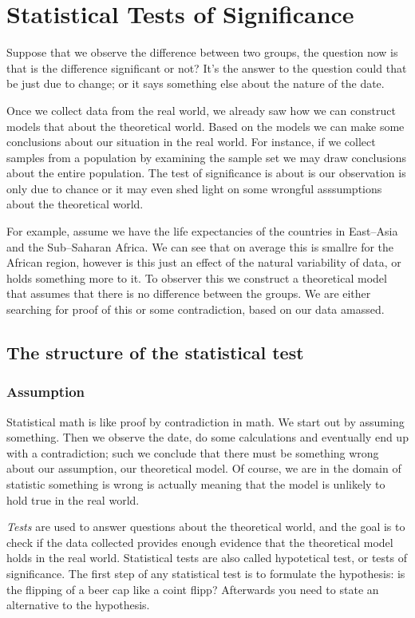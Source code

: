 \section{Statistical Tests of Significance}

Suppose that we observe the difference between two groups, the question now is
that is the difference significant or not? It's the answer to the question could
that be just due to change; or it says something else about the nature of the
date. 

Once we collect data from the real world, we already saw how we can construct
models that about the theoretical world. Based on the models we can make some
conclusions about our situation in the real world. For instance, if we collect
samples from a population by examining the sample set we may draw conclusions
about the entire population. The test of significance is about is our
observation is only due to chance or it may even shed light on some wrongful
asssumptions about the theoretical world. 

For example, assume we have the life expectancies of the countries in East--Asia
and the Sub--Saharan Africa. We can see that on average this is smallre for the
African region, however is this just an effect of the natural variability of
data, or holds something more to it. To observer this we construct a theoretical
model that assumes that there is no difference between the groups. We are either
searching for proof of this or some contradiction, based on our data amassed.

\subsection{The structure of the statistical test}

\subsubsection{Assumption}

Statistical math is like proof by contradiction in math. We start out by
assuming something. Then we observe the date, do some calculations and
eventually end up with a contradiction; such we conclude that there must be
something wrong about our assumption, our theoretical model. Of course, we are
in the domain of statistic something is wrong is actually meaning that the model
is unlikely to hold true in the real world.

\emph{Tests} are used to answer questions about the theoretical world, and the
goal is to check if the data collected provides enough evidence that the
theoretical model holds in the real world. Statistical tests are also called
hypotetical test, or tests of significance. The first step of any statistical
test is to formulate the hypothesis: is the flipping of a beer cap like a coint
flipp? Afterwards you need to state an alternative to the hypothesis.

